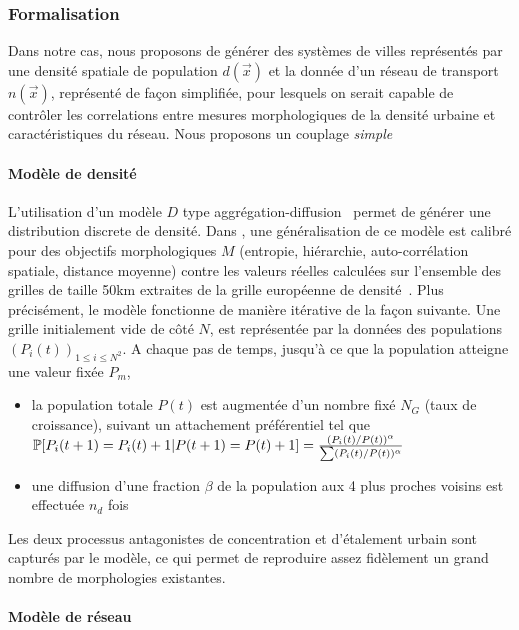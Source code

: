 \subsubsection{Formalisation}

Dans notre cas, nous proposons de générer des systèmes de villes représentés par une densité spatiale de population $d(\vec{x})$ et la donnée d'un réseau de transport $n(\vec{x})$, représenté de façon simplifiée, pour lesquels on serait capable de contrôler les correlations entre mesures morphologiques de la densité urbaine et caractéristiques du réseau. Nous proposons un couplage \emph{simple}


\paragraph{Modèle de densité}

L'utilisation d'un modèle $D$ type aggrégation-diffusion~\cite{batty2006hierarchy} permet de générer une distribution discrete de densité. Dans \cite{}, %
une généralisation de ce modèle est calibré pour des objectifs morphologiques $M$ (entropie, hiérarchie, auto-corrélation spatiale, distance moyenne) contre les valeurs réelles calculées sur l'ensemble des grilles de taille 50km extraites de la grille européenne de densité~\cite{eurostat}. Plus précisément, le modèle fonctionne de manière itérative de la façon suivante. Une grille initialement vide de côté $N$, est représentée par la données des populations $(P_i(t))_{1\leq i\leq N^2}$. A chaque pas de temps, jusqu'à ce que la population atteigne une valeur fixée $P_m$,
\begin{itemize}
\item la population totale $P(t)$ est augmentée d'un nombre fixé $N_G$ (taux de croissance), suivant un attachement préférentiel tel que $\operatorname{\mathbb{P}}\!\left[P_i(t+1)=P_i(t)+1|P(t+1)=P(t)+1\right]=\frac{(P_i(t)/P(t))^{\alpha}}{\sum(P_i(t)/P(t))^{\alpha}}$
\item une diffusion d'une fraction $\beta$ de la population aux 4 plus proches voisins est effectuée $n_d$ fois
\end{itemize}

Les deux processus antagonistes de concentration et d'étalement urbain sont capturés par le modèle, ce qui permet de reproduire assez fidèlement un grand nombre de morphologies existantes.


\paragraph{Modèle de réseau}

